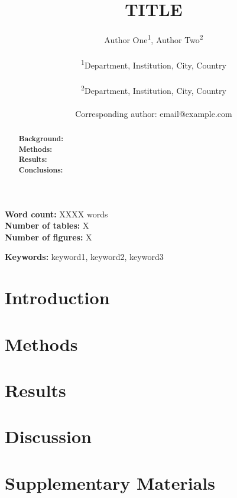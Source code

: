 \documentclass[12pt,a4paper]{article}
\title{\textbf{TITLE}}
\author{
  Author One\textsuperscript{1},
  Author Two\textsuperscript{2} \\\\
  \small\textsuperscript{1}Department, Institution, City, Country \\\\
  \small\textsuperscript{2}Department, Institution, City, Country \\\\
  \small Corresponding author: email@example.com
}
\date{}
\begin{document}
\maketitle

\noindent\textbf{Word count:} XXXX words \\
\textbf{Number of tables:} X \\
\textbf{Number of figures:} X

\newpage

\begin{abstract}
\noindent\textbf{Background:} \\
\textbf{Methods:} \\
\textbf{Results:} \\
\textbf{Conclusions:}
\end{abstract}

\textbf{Keywords:} keyword1, keyword2, keyword3

\newpage

\section{Introduction}

\section{Methods}

\section{Results}

\section{Discussion}




\newpage
\appendix
\section*{Supplementary Materials}
\end{document}
